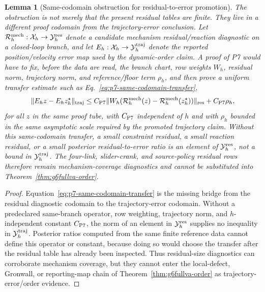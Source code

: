 \documentclass[preprint,12pt]{elsarticle}
\newtheorem{lemma}{Lemma}
\begin{document}
\begin{lemma}[Same-codomain obstruction for residual-to-error promotion]
\label{lem:p7-same-codomain-obstruction}
The obstruction is not merely that the present residual tables are finite.
They live in a different proof codomain from the trajectory-error conclusion.
Let \(\mathcal R_h^{\rm mech}:\mathcal X_h\to\mathcal Y_h^{\rm res}\)
denote a candidate mechanism residual/reaction diagnostic on a closed-loop
branch, and let \(E_h:\mathcal X_h\to\mathcal Y_h^{\rm traj}\) denote the
reported position/velocity error map used by the dynamic-order claim.  A proof
of P7 would have to fix, before the data are read, the branch chart, row
weights \(W_h\), residual norm, trajectory norm, and reference/floor term
\(\rho_h\), and then prove a uniform transfer estimate such as
Eq.~\eqref{eq:p7-same-codomain-transfer},
\begin{equation}
\label{eq:p7-same-codomain-transfer}
  \|E_h z-E_h z_h^\star\|_{\rm traj}
  \le
  C_{\rm P7}
  \|W_h(\mathcal R_h^{\rm mech}(z)-\mathcal R_h^{\rm mech}(z_h^\star))\|_{\rm res}
  + C_{\rm P7}\rho_h ,
\end{equation}
for all \(z\) in the same proof tube, with \(C_{\rm P7}\) independent of
\(h\) and with \(\rho_h\) bounded in the same asymptotic scale required by
the promoted trajectory claim.  Without this same-codomain transfer, a small
constraint residual, a small reaction residual, or a small posterior
residual-to-error ratio is an element of \(\mathcal Y_h^{\rm res}\), not a
bound in \(\mathcal Y_h^{\rm traj}\).  The four-link, slider-crank, and
source-policy residual rows therefore remain mechanism-coverage diagnostics
and cannot be substituted into Theorem~\ref{thm:g6fullva-order}.
\end{lemma}

\begin{proof}
Equation~\eqref{eq:p7-same-codomain-transfer} is the missing bridge from the
residual diagnostic codomain to the trajectory-error codomain.  Without a
predeclared same-branch operator, row weighting, trajectory norm, and
\(h\)-independent constant \(C_{\rm P7}\), the norm of an element in
\(\mathcal Y_h^{\rm res}\) supplies no inequality in
\(\mathcal Y_h^{\rm traj}\).  Posterior ratios computed from the same finite
reference data cannot define this operator or constant, because doing so
would choose the transfer after the residual table has already been inspected.
Thus residual-size diagnostics can corroborate mechanism coverage, but they
cannot enter the local-defect, Gronwall, or reporting-map chain of
Theorem~\ref{thm:g6fullva-order} as trajectory-error/order evidence.
\end{proof}
\end{document}
